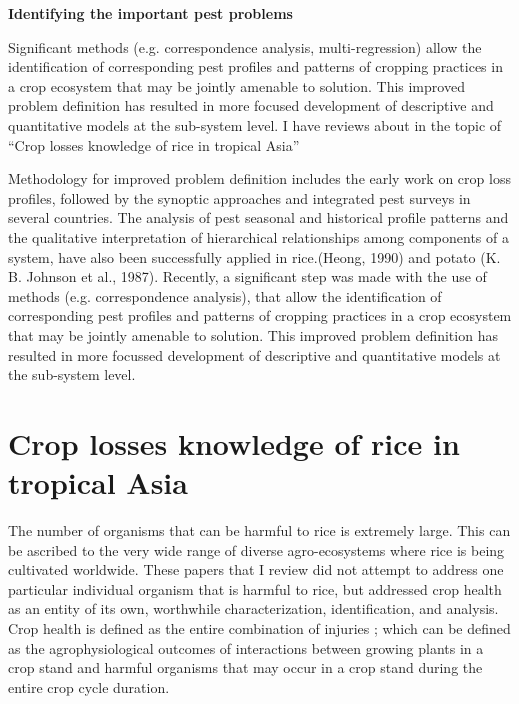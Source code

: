 \textbf{Identifying the important pest problems}


Significant methods (e.g. correspondence analysis, multi-regression) allow the identification of corresponding pest profiles and patterns of cropping practices in a crop ecosystem that may be jointly amenable to solution. This improved problem definition has resulted in more focused development of descriptive and quantitative models at the sub-system level. I have reviews about in the topic of ``Crop losses knowledge of rice in tropical Asia''


Methodology for improved problem definition includes the early work on crop loss profiles, followed by the synoptic approaches and integrated pest surveys in several countries. The analysis of pest seasonal and historical profile patterns and the qualitative interpretation of hierarchical relationships among components of a system, have also been successfully applied in rice.(Heong, 1990) and potato (K. B. Johnson et al., 1987). Recently, a significant step was made with the use of methods (e.g. correspondence analysis), that allow the identification of corresponding pest profiles and patterns of cropping practices in a crop ecosystem that may be jointly amenable to solution. This improved problem definition has resulted in more focussed development of descriptive and quantitative models at the sub-system level.

\section*{Crop losses knowledge of rice in tropical Asia}

The number of organisms that can be harmful to rice is extremely large. This can be ascribed to the very wide range of diverse agro-ecosystems where rice is being cultivated worldwide. These papers that I review did not attempt to address one particular individual organism that is harmful to rice, but addressed crop health as an entity of its own, worthwhile characterization, identification, and analysis. Crop health is defined as the entire combination of injuries \citep{Zadok1985}; which can be defined as the agrophysiological outcomes of interactions between growing plants in a crop stand and harmful organisms that may occur in a crop stand during the entire crop cycle duration. 

